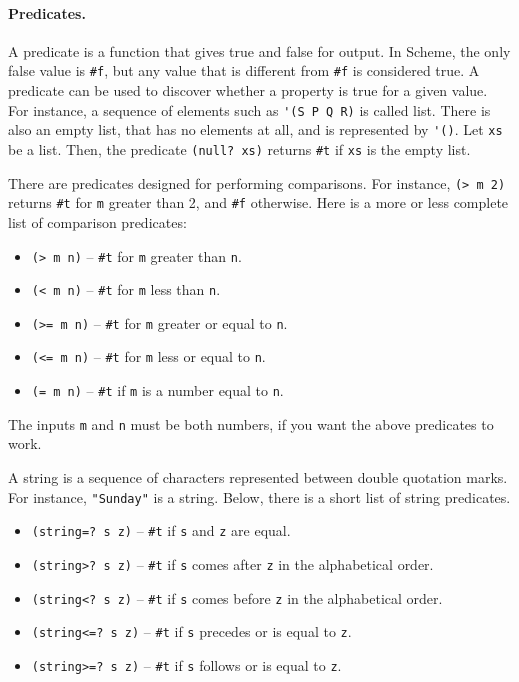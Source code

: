\documentclass[a4paper,12pt]{book}
\begin{document}
\paragraph{Predicates.} A predicate
is a function that gives
true and false for output. In Scheme,
the only false value is \verb|#f|, but
any value that is different from \verb|#f|
is considered true. A predicate can be used to discover
whether a property is true for a given value.
For instance, a sequence of elements
such as \verb|'(S P Q R)| is called
list. There is also an empty list,
that has no elements at all, and
is represented by \verb|'()|. Let
\verb|xs| be a list. Then, the predicate
\verb|(null? xs)| returns \verb|#t|
if \verb|xs| is the empty list.

There are predicates designed for
performing comparisons. For instance,
\verb|(> m 2)| returns \verb|#t| for
\verb|m| greater than 2, and \verb|#f|
otherwise. Here is a more or less complete
list of comparison predicates:
\begin{itemize}
\item\verb|(> m n)| -- \verb|#t| for
\verb|m| greater than \verb|n|.
\item\verb|(< m n)| -- \verb|#t| for
\verb|m| less than \verb|n|.
\item\verb|(>= m n)| -- \verb|#t| for
\verb|m| greater or equal to \verb|n|.
\item\verb|(<= m n)| -- \verb|#t| for
\verb|m| less or equal to \verb|n|.
\item\verb|(= m n)| -- \verb|#t| if
\verb|m| is a number equal to \verb|n|.
\end{itemize}
The inputs \verb|m| and \verb|n| must
be both numbers, if you want
the above predicates to work.


A string is a sequence of characters
represented between double quotation
marks. For instance, \verb|"Sunday"|
is a string. Below, there is a short
list of string predicates.
\begin{itemize}
\item\verb|(string=? s z)| -- \verb|#t|
if \verb|s| and \verb|z| are equal.
\item\verb|(string>? s z)| -- \verb|#t|
if \verb|s|  comes
after \verb|z| in the alphabetical order.
\item\verb|(string<? s z)| -- \verb|#t|
if \verb|s| comes before \verb|z|
in the alphabetical order.
\item\verb|(string<=? s z)| -- \verb|#t| if
\verb|s| precedes or is equal to \verb|z|.
\item\verb|(string>=? s z)| -- \verb|#t| if
\verb|s| follows or is equal to \verb|z|.
\end{itemize}
\end{document}

